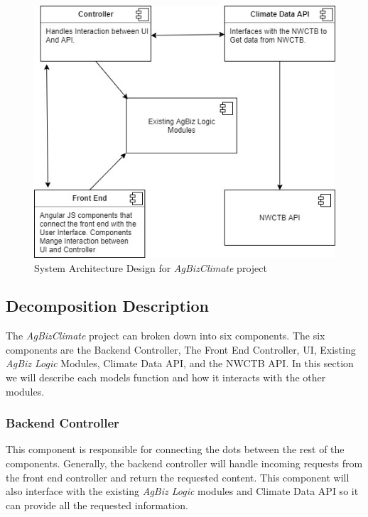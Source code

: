 \documentclass[onecolumn, draftclsnofoot,10pt, compsoc]{article}
\begin{document}
		\begin{figure}[htb]
			\begin{center}
				\includegraphics{UMLDiagrams/ArchitectureDesign.jpg}
			\end{center}
			\caption{System Architecture Design for \textit{AgBizClimate} project}
			\label{fig:Arch1}
		\end{figure}
		
		
	\subsection{Decomposition Description}
		The \textit{AgBizClimate} project can broken down into six components. The six components are the Backend Controller, The Front End Controller, UI, Existing \textit{AgBiz Logic} Modules, Climate Data API, and the NWCTB API. In this section we will describe each models function and how it interacts with the other modules.\\
		
		\subsubsection{Backend Controller}
			This component is responsible for connecting the dots between the rest of the components. Generally, the backend controller will handle incoming requests from the front end controller and return the requested content. This component will also interface with the existing \textit{AgBiz Logic} modules and Climate Data API so it can provide all the requested information.\\
			
\end{document}
